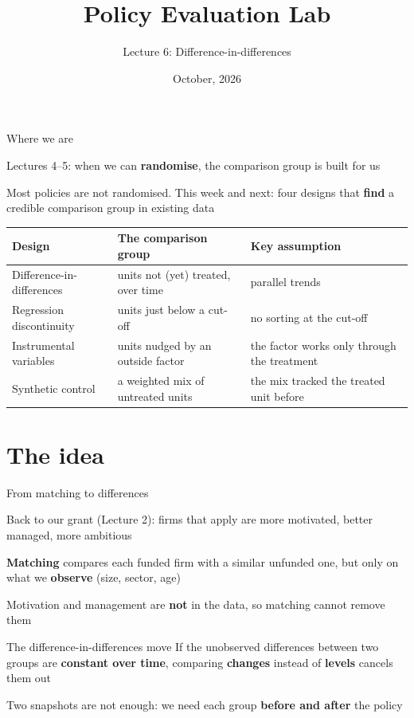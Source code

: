 \documentclass[aspectratio=169,xcolor=table]{beamer}
\title[Policy Evaluation Lab]{Policy Evaluation Lab}
\subtitle[Lecture 6]{Lecture 6: Difference-in-differences}
\date[\pelYear]{October, 2026}
\begin{document}
\frame{\titlepage}

\begin{frame}{Where we are}
\small
\bi
  \item Lectures 4--5: when we can \textbf{randomise}, the comparison group is built for us
  \item Most policies are not randomised. This week and next: four designs that \textbf{find} a credible comparison group in existing data
\ei
\vspace{0.1cm}
\centering\footnotesize
\begin{tabular}{L{3.4cm}L{5.0cm}L{5.0cm}}
\toprule
\textbf{Design} & \textbf{The comparison group} & \textbf{Key assumption} \\
\midrule
Difference-in-differences & units not (yet) treated, over time & parallel trends \\
Regression discontinuity & units just below a cut-off & no sorting at the cut-off \\
Instrumental variables & units nudged by an outside factor & the factor works only through the treatment \\
Synthetic control & a weighted mix of untreated units & the mix tracked the treated unit before \\
\bottomrule
\end{tabular}
\end{frame}

\section{The idea}

\begin{frame}{From matching to differences}
\bi
  \item Back to our grant (Lecture 2): firms that apply are more motivated, better managed, more ambitious
  \item \textbf{Matching} compares each funded firm with a similar unfunded one, but only on what we \textbf{observe} (size, sector, age)
  \item Motivation and management are \textbf{not} in the data, so matching cannot remove them
\ei
\vspace{0.1cm}
\begin{block}{The difference-in-differences move}
If the unobserved differences between two groups are \textbf{constant over time}, comparing \textbf{changes} instead of \textbf{levels} cancels them out
\end{block}
\bi
  \item Two snapshots are not enough: we need each group \textbf{before and after} the policy
\ei
\end{frame}
\end{document}
